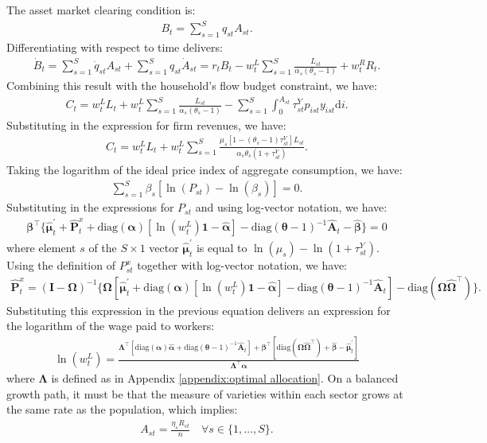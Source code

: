 \documentclass[12pt]{article}
\begin{document}
The asset market clearing condition is:
\begin{align*}
B_t = \sum_{s = 1}^S q_{st} A_{st}.
\end{align*}
Differentiating with respect to time delivers:
\begin{align*}
\dot{B}_t = \sum_{s = 1}^S \dot{q}_{st} A_{st} + \sum_{s = 1}^S q_{st} \dot{A}_{st} = r_t B_t - w_t^L \sum_{s = 1}^S \frac{L_{st}}{\alpha_s (\theta_s - 1)} + w_t^R R_t.
\end{align*}
Combining this result with the household's flow budget constraint, we have:
\begin{align*}
C_t = w_t^L L_t + w_t^L \sum_{s = 1}^S \frac{L_{st}}{\alpha_s (\theta_s - 1)}  - \sum_{s = 1}^S \int_0^{A_{st}} \tau_{st}^Y p_{ist} y_{ist} \text{d}i.
\end{align*}
Substituting in the expression for firm revenues, we have:
\begin{align*}
C_t = w_t^L L_t + w_t^L \sum_{s = 1}^S \frac{\mu_s [1 - (\theta_s - 1) \tau_{st}^Y] L_{st}}{\alpha_s \theta_s (1 + \tau_{st}^Y)}.
\end{align*}
Taking the logarithm of the ideal price index of aggregate consumption, we have:
\begin{align*}
\sum_{s = 1}^S \beta_s [\ln(P_{st}) - \ln(\beta_s)] = 0.
\end{align*}
Substituting in the expressions for $P_{st}$ and using log-vector notation, we have:
\begin{align*}
\bm{\beta}^{\top} \{\hat{\bm{\mu}}_t^{\prime} + \hat{\mathbf{P}}_t^x + \text{diag}(\bm{\alpha}) [\ln(w_t^L) \mathbf{1} - \hat{\bm{\alpha}}] - \text{diag}(\bm{\theta} - 1)^{-1} \hat{\mathbf{A}}_t - \hat{\bm{\beta}}\} = 0
\end{align*}
where element $s$ of the $S \times 1$ vector $\hat{\bm{\mu}}_t^{\prime}$ is equal to $\ln(\mu_s) - \ln(1 + \tau_{st}^Y)$. Using the definition of $P_{st}^x$ together with log-vector notation, we have:
\begin{align*}
\hat{\mathbf{P}}_t^x = (\mathbf{I} - \bm{\Omega})^{-1} \{\bm{\Omega} [\hat{\bm{\mu}}_t^{\prime} + \text{diag}(\bm{\alpha}) [\ln(w_t^L) \mathbf{1} - \hat{\bm{\alpha}}] - \text{diag}(\bm{\theta} - 1)^{-1} \hat{\mathbf{A}}_t] - \text{diag}(\bm{\Omega} \hat{\bm{\Omega}}^{\top})\}.
\end{align*}
Substituting this expression in the previous equation delivers an expression for the logarithm of the wage paid to workers:
\begin{align*}
\ln(w_t^L) = \frac{\bm{\Lambda}^{\top} [\text{diag}(\bm{\alpha}) \hat{\bm{\alpha}} + \text{diag}(\bm{\theta} - 1)^{-1} \hat{\mathbf{A}}_t] + \bm{\beta}^{\top} [\text{diag}(\bm{\Omega} \hat{\bm{\Omega}}^{\top}) + \hat{\bm{\beta}} - \hat{\bm{\mu}}_t^{\prime}]}{\bm{\Lambda}^{\top} \bm{\alpha}}
\end{align*}
where $\bm{\Lambda}$ is defined as in Appendix \ref{appendix:optimal allocation}. On a balanced growth path, it must be that the measure of varieties within each sector grows at the same rate as the population, which implies:
\begin{align*}
A_{st} = \frac{\eta_s R_{st}}{n} \quad \forall s \in \{1, \ldots, S\}.
\end{align*}
\end{document}
